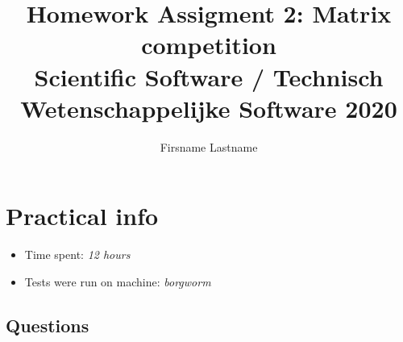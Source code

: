 \documentclass[a4paper]{article}
\title{Homework Assigment 2: Matrix competition \\ \large Scientific Software / Technisch Wetenschappelijke Software 2020}
\author{Firsname Lastname} %
\date{}
\begin{document}
\maketitle
\section*{Practical info}
\begin{itemize}
\item Time spent: \textit{ 12 hours} %
\item Tests were run on machine: \textit{borgworm}
\end{itemize}


\subsection*{Questions}
\end{document}
